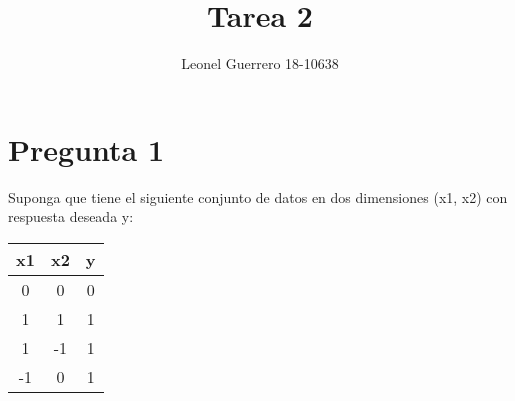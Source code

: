 \documentclass{article}
\title{Tarea 2}
\author{Leonel Guerrero 18-10638}
\theoremstyle{mytheoremstyle}
\theoremstyle{mytheoremstyle}
\theoremstyle{myproblemstyle}
\begin{document}
\maketitle
\section{Pregunta 1}

Suponga que tiene el siguiente conjunto de datos en dos dimensiones (x1, x2) con respuesta deseada y:

\begin{table}[h]
  \centering
  \begin{tabular}{ccc}
    \hline
    x1 & x2 & y \\ \hline
    0  & 0  & 0 \\
    1  & 1  & 1 \\
    1  & -1 & 1 \\
    -1 & 0  & 1 \\ \hline
  \end{tabular}
\end{table}
\end{document}

